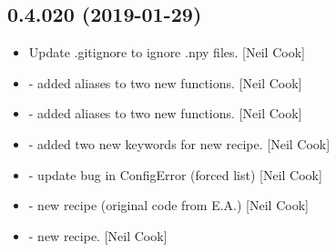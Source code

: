 \documentclass[a4paper,10pt,english]{report}
\begin{document}
\subsection{0.4.020 (2019-01-29)}
\label{\detokenize{misc/changelog:id204}}\begin{itemize}
\item {} 
Update .gitignore to ignore .npy files. {[}Neil Cook{]}

\item {} 
 - added aliases to two new  functions. {[}Neil
Cook{]}

\item {} 
 - added aliases to two new 
functions. {[}Neil Cook{]}

\item {} 
 - added two new keywords for new  recipe.
{[}Neil Cook{]}

\item {} 
 - update bug in ConfigError (forced list) {[}Neil Cook{]}

\item {} 
 - new  recipe (original code from E.A.) {[}Neil
Cook{]}

\item {} 
 - new  recipe. {[}Neil Cook{]}

\end{itemize}
\end{document}
